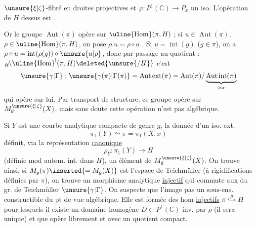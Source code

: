 $\unsure{\xi|\zeta}$-fibré en droites projectives et $\varphi:P^1(\mathbb C)\longrightarrow P_x$ un iso. L'opération de $H$ dessus est .

Or le groupe $\operatorname{Aut}(\pi)$ opère  sur $\uline{\operatorname{Hom}}(\pi,H)$ ;  si $u\in\operatorname{Aut}(\pi)$, $\rho\in\uline{\operatorname{Hom}}(\pi,H)$, on pose $\rho.u=\rho\circ u$ . Si $u=\operatorname{int}(g)$ ($g\in\pi$), on a $\rho\circ u=\operatorname{int}(\rho(g))\circ\unsure{u|\rho}$, donc par passage au quotient : ${}_H\!\backslash\uline{\operatorname{Hom}}^!(\pi,H)\deleted{\unsure{/H}}$ c'est
\[
\unsure{\gamma|\Gamma}:\unsure{\gamma(\pi)|\Gamma(\pi)}=\operatorname{Aut\,ext}(\pi)=\operatorname{Aut}(\pi)/\underbrace{\operatorname{Aut\,int}(\pi)}_{\simeq\pi}
\]
qui opère sur lui. Par transport de structure, ce groupe opère sur $M_g^{\unsure{\xi|\zeta}}(X)$, mais sans doute cette opération n'est pas algébrique.

Si $Y$ est une courbe analytique compacte  de genre $g$, la donnée d'un iso. ext.
\[
\pi_1(Y)\simeq\pi=\pi_1(X,x)
\]
définit, via la représentation \uline{canonique}
\[
\rho_Y:\pi_1(Y)\longrightarrow H
\]
(définie mod autom. int. dans $H$), un élément de $M_g^{\unsure{\xi|\zeta}}(X)$. On trouve ainsi, si $M_g(\pi)\inserted{=M_g(X)}$ est l'espace de Teichmüller (à rigidifications définies par $\pi$), on trouve un morphisme analytique \uline{injectif}
qui commute aux  du gr. de Teichmüller $\unsure{\gamma|\Gamma}$. On suspecte que l'image  pas un sous-ens. constructible du pt de vue algébrique. Elle est formée des hom \uline{injectifs} $\pi\lhook\joinrel\xrightarrow{\rho}H$ pour lesquels il existe un domaine homogène $D\subset P^1(\mathbb C)$ inv. par $\rho$ (il sera unique) et que   opère librement et avec un quotient compact.

